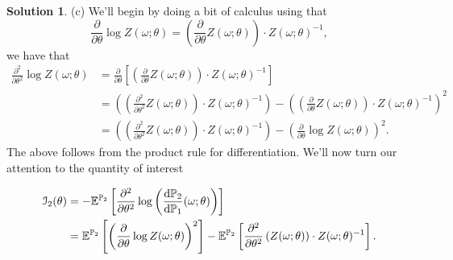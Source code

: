 \documentclass[12pt]{article}
\def\rd{{\rm d}}
\theoremstyle{definition}
\newtheorem{sol}{Solution}
\theoremstyle{remark}
\begin{document}
\begin{sol}
    (c) We'll begin by doing a bit of calculus using that 
\begin{equation*}
    \frac{\partial}{\partial\theta} \log Z(\omega; \theta) =  \left( \frac{\partial}{\partial\theta} Z(\omega; \theta)  \right) \cdot Z(\omega; \theta)^{-1},
\end{equation*}
we have that 
\begin{align*}
    \frac{\partial^{2}}{\partial\theta^{2}} \log Z(\omega; \theta) &=   \frac{\partial}{\partial\theta}  \left[ \left( \frac{\partial}{\partial\theta} Z(\omega; \theta) \right) \cdot Z(\omega; \theta)^{-1} \right]\\
                                                                   &= \left(\left(\frac{\partial^{2}}{\partial\theta^{2}} Z(\omega; \theta) \right) \cdot Z(\omega; \theta)^{-1} \right)  
                                                                   - \left( \left(\frac{\partial}{\partial\theta} Z(\omega; \theta) \right) \cdot Z(\omega; \theta)^{-1} \right)^{2}\\
                                                                   &=\left( \left(\frac{\partial^{2}}{\partial\theta^{2}} Z(\omega; \theta) \right) \cdot Z(\omega; \theta)^{-1} \right)  
                                                                   - \left(  \frac{\partial}{\partial\theta} \log Z(\omega; \theta)  \right)^{2}.
\end{align*}
The above follows from the product rule for differentiation. We'll now turn our attention to the quantity of interest

\begin{align*}
    \mathcal{I}_2(\theta) &= -\mathbb{E}^{\mathbb{P}_2}\left[\frac{\partial^2}{\partial\theta^2}\log\left(\frac{\rd\mathbb{P}_2}{\rd\mathbb{P}_1}(\omega;\theta)\right)\right]\\
                          &=  \mathbb{E}^{\mathbb{P}_2}\left[ \left(  \frac{\partial}{\partial\theta} \log Z(\omega; \theta)  \right)^{2}   \right] 
                      - \mathbb{E}^{\mathbb{P}_2}\left[\frac{\partial^{2}}{\partial\theta^{2}} \left(Z(\omega; \theta) \right) \cdot Z(\omega; \theta)^{-1} \right].   
\end{align*}


\end{sol}
\end{document}
